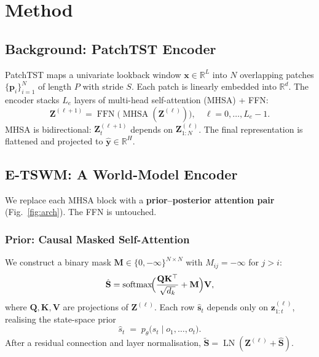 \documentclass[conference]{IEEEtran}
\begin{document}
\section{Method}

\subsection{Background: PatchTST Encoder}

PatchTST maps a univariate lookback window $\mathbf{x}\in\mathbb{R}^L$ into $N$ overlapping patches $\{\mathbf{p}_i\}_{i=1}^N$ of length $P$ with stride $S$. Each patch is linearly embedded into $\mathbb{R}^d$. The encoder stacks $L_e$ layers of multi-head self-attention (MHSA) + FFN:
\begin{equation}
    \mathbf{Z}^{(\ell+1)} = \operatorname{FFN}\!\bigl(\operatorname{MHSA}(\mathbf{Z}^{(\ell)})\bigr), \quad \ell=0,\ldots,L_e{-}1.
\end{equation}
MHSA is bidirectional: $\mathbf{Z}_t^{(\ell+1)}$ depends on $\mathbf{Z}_{1:N}^{(\ell)}$. The final representation is flattened and projected to $\hat{\mathbf{y}} \in \mathbb{R}^H$.

\subsection{E-TSWM: A World-Model Encoder}

We replace each MHSA block with a \textbf{prior--posterior attention pair} (Fig.~\ref{fig:arch}). The FFN is untouched.

\subsubsection{Prior: Causal Masked Self-Attention}

We construct a binary mask $\mathbf{M}\in\{0,-\infty\}^{N\times N}$ with $M_{ij}=-\infty$ for $j>i$:
\begin{equation}\label{eq:prior}
    \hat{\mathbf{S}} = \operatorname{softmax}\!\Bigl(\frac{\mathbf{Q}\mathbf{K}^\top}{\sqrt{d_k}} + \mathbf{M}\Bigr)\mathbf{V},
\end{equation}
where $\mathbf{Q},\mathbf{K},\mathbf{V}$ are projections of $\mathbf{Z}^{(\ell)}$. Each row $\hat{\mathbf{s}}_t$ depends only on $\mathbf{z}_{1:t}^{(\ell)}$, realising the state-space prior
\begin{equation}
    \hat{s}_t \;=\; p_\theta\!\bigl(s_t \mid o_1, \ldots, o_t\bigr).
\end{equation}
After a residual connection and layer normalisation,
$\tilde{\mathbf{S}} = \operatorname{LN}(\mathbf{Z}^{(\ell)} + \hat{\mathbf{S}})$.
\end{document}
